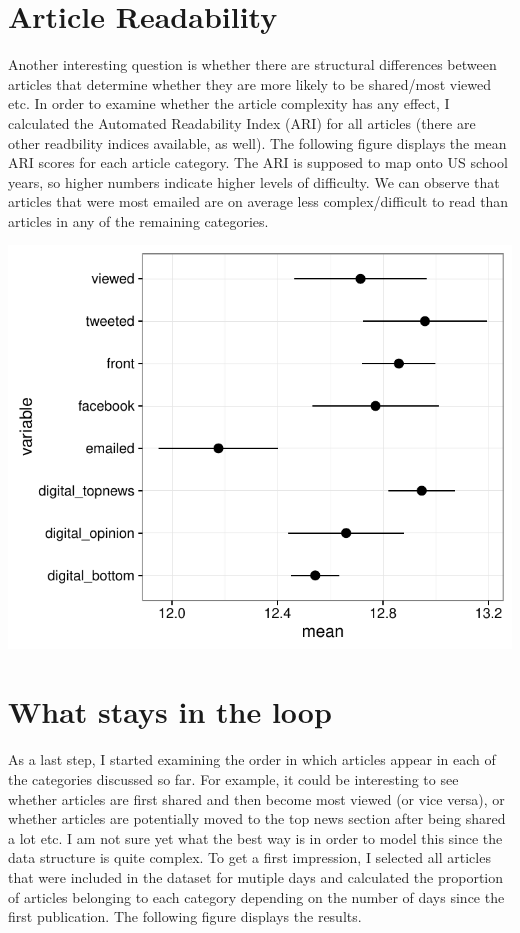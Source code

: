 \documentclass[12pt]{article}\usepackage[]{graphicx}\usepackage[]{color}
\makeatletter
\def\maxwidth{ %
  \ifdim\Gin@nat@width>\linewidth
    \linewidth
  \else
    \Gin@nat@width
  \fi
}
\newenvironment{knitrout}{}{} %
\makeatother
\begin{document}
\section{Article Readability}

Another interesting question is whether there are structural differences between articles that determine whether they are more likely to be shared/most viewed etc. In order to examine whether the article complexity has any effect, I calculated the Automated Readability Index (ARI) for all articles (there are other readbility indices available, as well). The following figure displays the mean ARI scores for each article category. The ARI is supposed to map onto US school years, so higher numbers indicate higher levels of difficulty. We can observe that articles that were most emailed are on average less complex/difficult to read than articles in any of the remaining categories.

\begin{knitrout}
\color{fgcolor}
\includegraphics[width=\maxwidth]{figure/unnamed-chunk-10-1} 

\end{knitrout}


\section{What stays in the loop}

As a last step, I started examining the order in which articles appear in each of the categories discussed so far. For example, it could be interesting to see whether articles are first shared and then become most viewed (or vice versa), or whether articles are potentially moved to the top news section after being shared a lot etc. I am not sure yet what the best way is in order to model this since the data structure is quite complex. To get a first impression, I selected all articles that were included in the dataset for mutiple days and calculated the proportion of articles belonging to each category depending on the number of days since the first publication. The following figure displays the results.
\end{document}
